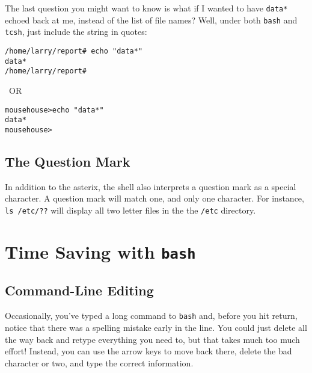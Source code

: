 The last question you might want to know is what if I wanted to have
{\tt data*} echoed back at me, instead of the list of file names?
Well, under both {\tt bash} and {\tt tcsh}, just include the string in
quotes:

\begin{minipage}{2.6in}\begin{screen}
\begin{verbatim}
/home/larry/report# echo "data*"
data*
/home/larry/report#
\end{verbatim}\end{screen}\end{minipage}\ {\large OR}\ 
\begin{minipage}{2.6in}\begin{screen}
\begin{verbatim}
mousehouse>echo "data*"
data*
mousehouse>
\end{verbatim}\end{screen}\end{minipage}

\subsection{The Question Mark}

In addition to the asterix, the shell also interprets a question mark
as a special character.  A question mark will match one, and only one
character. For instance, {\tt ls /etc/??} will display all two letter
files in the the {\tt /etc} directory.


\section{Time Saving with {\tt bash}}

\subsection{Command-Line Editing}

Occasionally, you've typed a long command to {\tt bash} and,
before you hit return, notice that there was a spelling mistake early in
the line.  You could just delete all the way back and retype everything you
need to, but that takes much too much effort! Instead, you can use the
arrow keys to move back there, delete the bad character or two, and type
the correct information.

